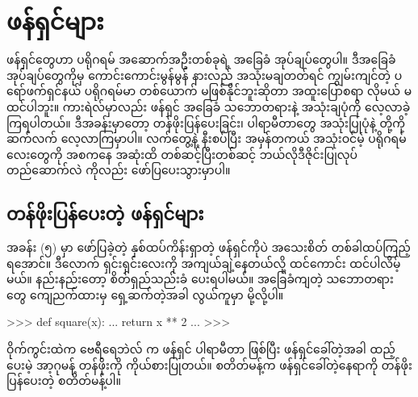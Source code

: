 \chapter{ဖန်ရှင်များ}
ဖန်ရှင်တွေဟာ ပရိုဂရမ် အဆောက်အဦးတစ်ခုရဲ့ အခြေခံ အုပ်ချပ်တွေပါ။ ဒီအခြေခံ အုပ်ချပ်တွေကိုမှ ကောင်းကောင်းမွန်မွန် နားလည် အသုံးမချတတ်ရင် ကျွမ်းကျင်တဲ့ ပရော်ဖက်ရှင်နယ် ပရိုဂရမ်မာ တစ်ယောက် မဖြစ်နိုင်ဘူးဆိုတာ အထူးပြောစရာ လိုမယ် မထင်ပါဘူး။ ကားရဲလ်မှာလည်း ဖန်ရှင် အခြေခံ သဘောတရားနဲ့ အသုံးချပုံကို လေ့လာခဲ့ကြရပါတယ်။ ဒီအခန်းမှာတော့ တန်ဖိုးပြန်ပေးခြင်း၊ ပါရာမီတာတွေ အသုံးပြုပုံနဲ့  တို့ကို ဆက်လက် လေ့လာကြမှာပါ။ လက်တွေ့နဲ့ နီးစပ်ပြီး အမှန်တကယ် အသုံးဝင်မဲ့ ပရိုဂရမ်လေးတွေကို  အစကနေ အဆုံးထိ တစ်ဆင့်ပြီးတစ်ဆင့် ဘယ်လိုဒီဇိုင်းပြုလုပ် တည်ဆောက်လဲ ကိုလည်း ဖော်ပြပေးသွားမှာပါ။

\section{တန်ဖိုးပြန်ပေးတဲ့ ဖန်ရှင်များ}
အခန်း (၅) မှာ ဖော်ပြခဲ့တဲ့ နှစ်ထပ်ကိန်းရှာတဲ့  ဖန်ရှင်ကိုပဲ အသေးစိတ် တစ်ခါထပ်ကြည့်ရအောင်။ ဒီလောက် ရှင်းရှင်းလေးကို အကျယ်ချဲ့နေတယ်လို့ ထင်ကောင်း ထင်ပါလိမ့်မယ်။ နည်းနည်းတော့  စိတ်ရှည်သည်းခံ ပေးရပါမယ်။ အခြေခံကျတဲ့ သဘောတရားတွေ ကျေညက်ထားမှ ရှေ့ဆက်တဲ့အခါ လွယ်\allowbreak ကူမှာ မို့လို့ပါ။  %
%
\begin{codetxt}
>>> def square(x):
...     return x ** 2
...
>>> 
\end{codetxt}
%
ဝိုက်ကွင်းထဲက ဗေရီရေဘဲလ်   က ဖန်ရှင် ပါရာမီတာ  ဖြစ်ပြီး ဖန်ရှင်ခေါ်တဲ့အခါ ထည့်ပေးမဲ့ အာ့ဂုမန့်   တန်ဖိုးကို ကိုယ်စားပြုတယ်။  စတိတ်မန့်က ဖန်ရှင်ခေါ်တဲ့နေရာကို တန်ဖိုးပြန်ပေးတဲ့ စတိတ်မန့်ပါ။ 

